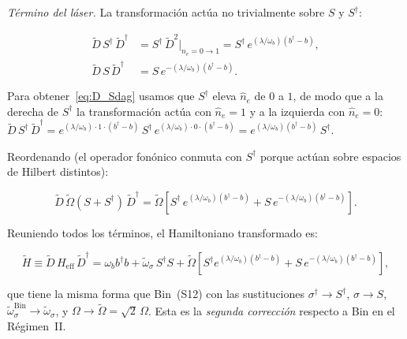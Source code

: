 \documentclass[12pt]{article}
\begin{document}
	\medskip
	\noindent
	\textit{T\'ermino del l\'aser.}
	La transformaci\'on act\'ua no trivialmente sobre $S$ y $S^\dagger$:
	
	\begin{align}
		\widetilde{D}\,S^\dagger\,\widetilde{D}^\dagger
		&= S^\dagger\,\widetilde{D}^2\big|_{\hat{n}_e=0\to1}
		= S^\dagger\,e^{(\lambda/\omega_b)(b^\dagger - b)},
		\label{eq:D_Sdag}\\[4pt]
		\widetilde{D}\,S\,\widetilde{D}^\dagger
		&= S\,e^{-(\lambda/\omega_b)(b^\dagger - b)}.
		\label{eq:D_S}
	\end{align}
	
	\noindent
	Para obtener~\eqref{eq:D_Sdag} usamos que $S^\dagger$ eleva
	$\hat{n}_e$ de $0$ a $1$, de modo que a la derecha de $S^\dagger$ la
	transformaci\'on act\'ua con $\hat{n}_e = 1$ y a la izquierda con
	$\hat{n}_e = 0$:
	$\widetilde{D}\,S^\dagger\,\widetilde{D}^\dagger
	= e^{(\lambda/\omega_b)\cdot 1\cdot(b^\dagger - b)}\,S^\dagger
	\,e^{(\lambda/\omega_b)\cdot 0\cdot(b^\dagger-b)}
	= e^{(\lambda/\omega_b)(b^\dagger-b)}\,S^\dagger$.
	
	\noindent
	Reordenando (el operador fon\'onico conmuta con $S^\dagger$ porque
	actúan sobre espacios de Hilbert distintos):
	
	\begin{equation}
		\widetilde{D}\,\widetilde\Omega(S+S^\dagger)\,\widetilde{D}^\dagger
		= \widetilde\Omega\left[
		S^\dagger\,e^{(\lambda/\omega_b)(b^\dagger-b)}
		+ S\,e^{-(\lambda/\omega_b)(b^\dagger-b)}
		\right].
		\label{eq:D_laser}
	\end{equation}
	
	\medskip
	\noindent
	Reuniendo todos los t\'erminos, el Hamiltoniano transformado es:
	
	\begin{equation}
		\widetilde{H} \equiv \widetilde{D}\,H_\mathrm{eff}\,\widetilde{D}^\dagger
		= \omega_b b^\dagger b
		+ \widetilde\omega_\sigma\,S^\dagger S
		+ \widetilde\Omega\left[
		S^\dagger e^{(\lambda/\omega_b)(b^\dagger - b)}
		+ S\,e^{-(\lambda/\omega_b)(b^\dagger - b)}
		\right],
		\label{eq:H_transformado}
	\end{equation}
	
	\noindent
	que tiene la misma forma que Bin~(S12) con las sustituciones
	$\sigma^\dagger \to S^\dagger$, $\sigma \to S$,
	$\tilde\omega_\sigma^\mathrm{Bin} \to \widetilde\omega_\sigma$,
	y $\Omega \to \widetilde\Omega = \sqrt{2}\,\Omega$.
	Esta es la \emph{segunda correcci\'on} respecto a Bin en el
	R\'egimen~II.
	
\end{document}
